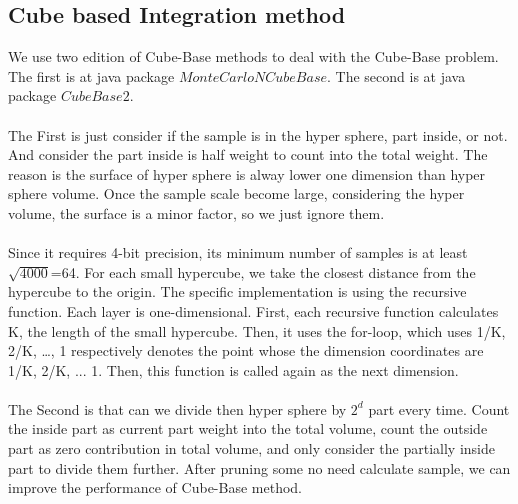 \documentclass{article}
\begin{document}
		\subsection*{Cube based Integration method}
		\label{sub:cbim}
		We use two edition of Cube-Base methods to deal with the Cube-Base problem. The first is at java package $MonteCarloNCubeBase$. The second is at java package $CubeBase2$.
		\\
		\\
		The First is just consider if the sample is in the hyper sphere, part inside, or not. And consider the part inside is half weight to count into the total weight. The reason is the surface of hyper sphere is alway lower one dimension than hyper sphere volume. Once the sample scale become large, considering the hyper volume, the surface is a minor factor, so we just ignore them.
		\\
		\\
		Since it requires 4-bit precision, its minimum number of samples is at least $\sqrt{4000}$=64. For each small hypercube, we take the closest distance from the hypercube to the origin.
		The specific implementation is  using the recursive function. Each layer is one-dimensional. First, each recursive function calculates K, the length of the small hypercube. Then, it uses the for-loop, which uses 1/K, 2/K, …, 1 respectively denotes the point whose the dimension coordinates are 1/K, 2/K, ... 1. Then, this function is called again as the next dimension.
		\\
		\\
		The Second is that can we divide then hyper sphere by $2^{d}$ part every time. Count the inside part as current part weight into the total volume, count the outside part as zero contribution in total volume, and only consider the partially inside part to divide them further. After pruning some no need calculate sample, we can improve the performance of Cube-Base method.
		\\
		\\
\end{document}
